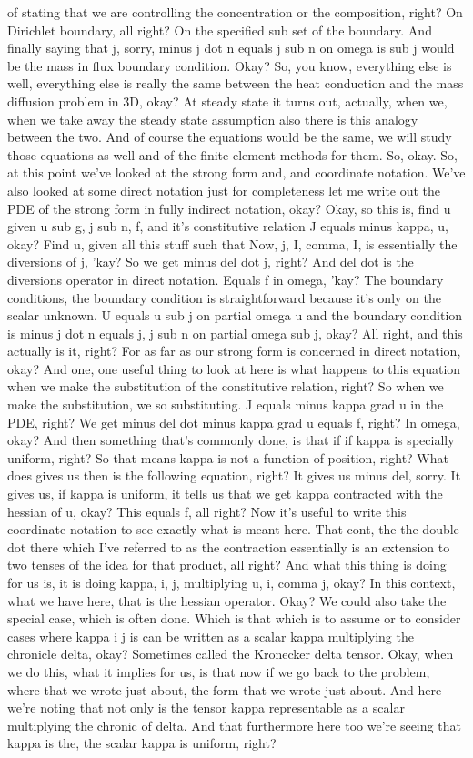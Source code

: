 \documentclass[10pt]{article}
\begin{document}
of stating that we are controlling the concentration or the composition, right? On Dirichlet boundary, all right? On the specified sub set of the boundary. And finally saying that j, sorry, minus j dot n equals j sub n on omega is sub j would be the mass in flux boundary condition. Okay? So, you know, everything else is well, everything else is really the same between the heat conduction and the mass diffusion problem in 3D, okay? At steady state it turns out, actually, when we, when we take away the steady state assumption also there is this analogy between the two. And of course the equations would be the same, we will study those equations as well and of the finite element methods for them. So, okay. So, at this point we've looked at the strong form and, and coordinate notation. We've also looked at some direct notation just for completeness let me write out the PDE of the strong form in fully indirect notation, okay? Okay, so this is, find u given u sub g, j sub n, f, and it's constitutive relation J equals minus kappa, u, okay? Find u, given all this stuff such that Now, j, I, comma, I, is essentially the diversions of j, 'kay? So we get minus del dot j, right? And del dot is the diversions operator in direct notation. Equals f in omega, 'kay? The boundary conditions, the  boundary condition is straightforward because it's only on the scalar unknown. U equals u sub j on partial omega u and the boundary condition is minus j dot n equals j, j sub n on partial omega sub j, okay? All right, and this actually is it, right? For as far as our strong form is concerned in direct notation, okay? And one, one useful thing to look at here is what happens to this equation when we make the substitution of the constitutive relation, right? So when we make the substitution, we so substituting. J equals minus kappa grad u in the PDE, right? We get minus del dot minus kappa grad u equals f, right? In omega, okay? And then something that's commonly done, is that if if kappa is specially uniform, right? So that means kappa is not a function of position, right? What does gives us then is the following equation, right? It gives us minus del, sorry. It gives us, if kappa is uniform, it tells us that we get kappa contracted with the hessian of u, okay? This equals f, all right? Now it's useful to write this coordinate notation to see exactly what is meant here. That cont, the the double dot there which I've referred to as the contraction essentially is an extension to two tenses of the idea for that product, all right? And what this thing is doing for us is, it is doing kappa, i, j, multiplying u, i, comma j, okay? In this context, what we have here, that is the hessian operator. Okay? We could also take the special case, which is often done. Which is that which is to assume or to consider cases where kappa i j is can be written as a scalar kappa multiplying the chronicle delta, okay? Sometimes called the Kronecker delta tensor. Okay, when we do this, what it implies for us, is that now if we go back to the problem, where that we wrote just about, the form that we wrote just about. And here we're noting that not only is the tensor kappa representable as a scalar multiplying the chronic of delta. And that furthermore here too we're seeing that kappa is the, the scalar kappa is uniform, right? 
\end{document}
